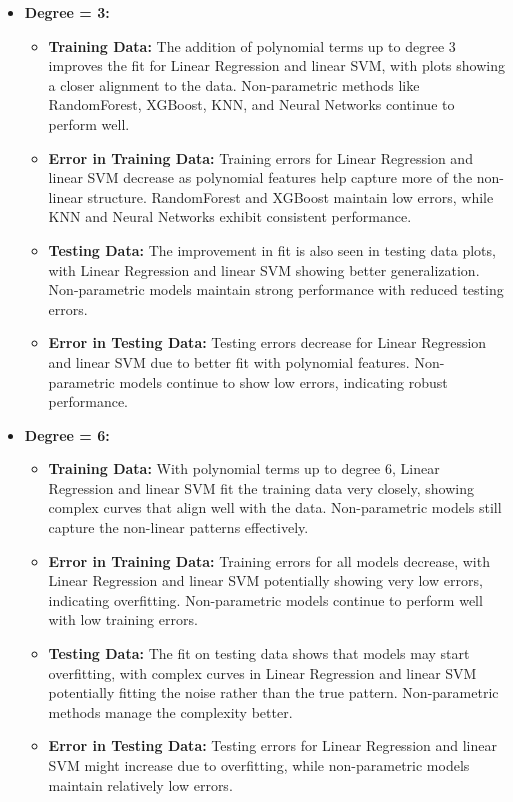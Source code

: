 \begin{itemize}
    \item \textbf{Degree = 3:}
    \begin{itemize}
        \item \textbf{Training Data:} The addition of polynomial terms up to degree 3 improves the fit for Linear Regression and linear SVM, with plots showing a closer alignment to the data. Non-parametric methods like RandomForest, XGBoost, KNN, and Neural Networks continue to perform well.
        \item \textbf{Error in Training Data:} Training errors for Linear Regression and linear SVM decrease as polynomial features help capture more of the non-linear structure. RandomForest and XGBoost maintain low errors, while KNN and Neural Networks exhibit consistent performance.
        \item \textbf{Testing Data:} The improvement in fit is also seen in testing data plots, with Linear Regression and linear SVM showing better generalization. Non-parametric models maintain strong performance with reduced testing errors.
        \item \textbf{Error in Testing Data:} Testing errors decrease for Linear Regression and linear SVM due to better fit with polynomial features. Non-parametric models continue to show low errors, indicating robust performance.
    \end{itemize}

    \item \textbf{Degree = 6:}
    \begin{itemize}
        \item \textbf{Training Data:} With polynomial terms up to degree 6, Linear Regression and linear SVM fit the training data very closely, showing complex curves that align well with the data. Non-parametric models still capture the non-linear patterns effectively.
        \item \textbf{Error in Training Data:} Training errors for all models decrease, with Linear Regression and linear SVM potentially showing very low errors, indicating overfitting. Non-parametric models continue to perform well with low training errors.
        \item \textbf{Testing Data:} The fit on testing data shows that models may start overfitting, with complex curves in Linear Regression and linear SVM potentially fitting the noise rather than the true pattern. Non-parametric methods manage the complexity better.
        \item \textbf{Error in Testing Data:} Testing errors for Linear Regression and linear SVM might increase due to overfitting, while non-parametric models maintain relatively low errors.
    \end{itemize}


\end{itemize}
